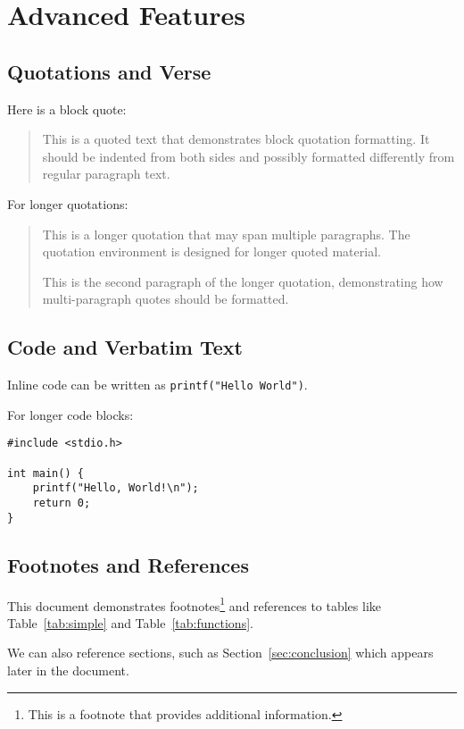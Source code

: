 \documentclass[11pt,letterpaper]{article}
\begin{document}
\section{Advanced Features}

\subsection{Quotations and Verse}

Here is a block quote:

\begin{quote}
This is a quoted text that demonstrates block quotation formatting. It should be indented from both sides and possibly formatted differently from regular paragraph text.
\end{quote}

For longer quotations:

\begin{quotation}
This is a longer quotation that may span multiple paragraphs. The quotation environment is designed for longer quoted material.

This is the second paragraph of the longer quotation, demonstrating how multi-paragraph quotes should be formatted.
\end{quotation}

\subsection{Code and Verbatim Text}

Inline code can be written as \verb|printf("Hello World")|.

For longer code blocks:

\begin{verbatim}
#include <stdio.h>

int main() {
    printf("Hello, World!\n");
    return 0;
}
\end{verbatim}

\subsection{Footnotes and References}

This document demonstrates footnotes\footnote{This is a footnote that provides additional information.} and references to tables like Table~\ref{tab:simple} and Table~\ref{tab:functions}.

We can also reference sections, such as Section~\ref{sec:conclusion} which appears later in the document.
\end{document}
